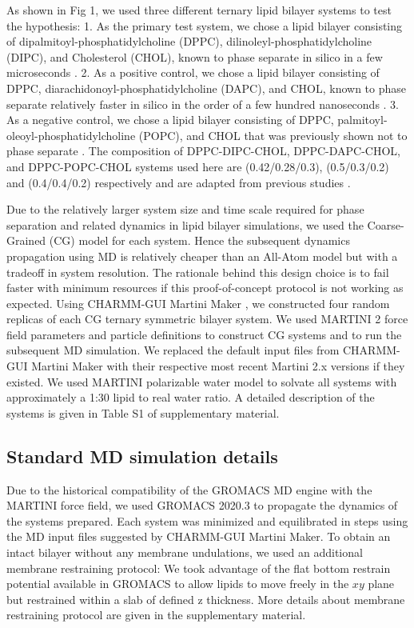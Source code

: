 \documentclass{biophys-new}
\begin{document}
As shown in Fig 1, we used three different ternary lipid bilayer systems to test the hypothesis:
1. As the primary test system, we chose a lipid bilayer consisting of dipalmitoyl-phosphatidylcholine (DPPC), dilinoleyl-phosphatidylcholine (DIPC), and Cholesterol (CHOL), known to phase separate in silico in a few microseconds \cite{Risselada2008, Schafer2010, Janosi2012, Doma2012, Jong2013, Liu2020, Su2020}.
2. As a positive control, we chose a lipid bilayer consisting of DPPC, diarachidonoyl-phosphatidylcholine (DAPC), and CHOL, known to phase separate relatively faster in silico in the order of a few hundred nanoseconds \cite{Lin2016, Lin2019, Davis2013a}.
3. As a negative control, we chose a lipid bilayer consisting of DPPC, palmitoyl-oleoyl-phosphatidylcholine (POPC), and CHOL that was previously shown not to phase separate \cite{Veatch2003,Davis2013a}.
The composition of DPPC-DIPC-CHOL, DPPC-DAPC-CHOL, and DPPC-POPC-CHOL systems used here are (0.42/0.28/0.3), (0.5/0.3/0.2) and (0.4/0.4/0.2) respectively and are adapted from previous studies \cite{Risselada2008, Lin2016, Davis2013a}.

Due to the relatively larger system size and time scale required for phase separation and related dynamics in lipid bilayer simulations, we used the Coarse-Grained (CG) model for each system. Hence the subsequent dynamics propagation using MD is relatively cheaper than an All-Atom model but with a tradeoff in system resolution.
The rationale behind this design choice is to fail faster with minimum resources if this proof-of-concept protocol is not working as expected. 
Using CHARMM-GUI Martini Maker \cite{Qi2015}, we constructed four random replicas of each CG ternary symmetric bilayer system.
We used MARTINI 2 force field parameters and particle definitions\cite{Marrink2007, DeJong2013} to construct CG systems and to run the subsequent MD simulation.
We replaced the default input files from CHARMM-GUI Martini Maker with their respective most recent Martini 2.x versions if they existed.
We used MARTINI polarizable water model\cite{Yesylevskyy2010} to solvate all systems with approximately a 1:30 lipid to real water ratio.
A detailed description of the systems is given in Table S1 of supplementary material.

\subsection*{Standard MD simulation details}

Due to the historical compatibility of the GROMACS MD engine with the MARTINI force field, we used GROMACS 2020.3\cite{Abraham2015} to propagate the dynamics of the systems prepared. 
Each system was minimized and equilibrated in steps using the MD input files suggested by CHARMM-GUI Martini Maker.
To obtain an intact bilayer without any membrane undulations, we used an additional membrane restraining protocol: 
We took advantage of the flat bottom restrain potential available in GROMACS to allow lipids to move freely in the $xy$ plane but restrained within a slab of defined z thickness.
More details about membrane restraining protocol are given in the supplementary material.
\end{document}
